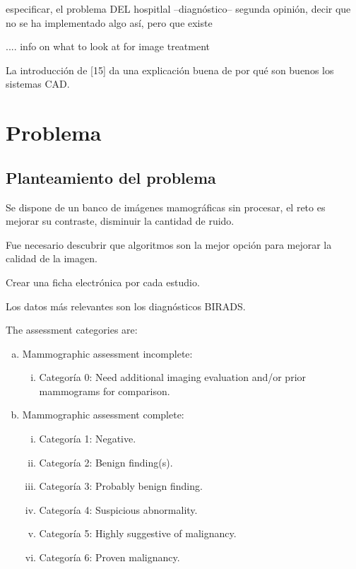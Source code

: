 especificar, el problema DEL
hospitlal --diagnóstico-- segunda opinión, decir que no se ha implementado algo
así, pero que existe
 
.... info on what to look at for image treatment 

La introducción de [15] da una explicación buena de por qué son buenos los
sistemas CAD.

\section{Problema}
\subsection{Planteamiento del problema}

Se dispone de un banco de imágenes mamográficas sin procesar, el reto es mejorar
su contraste, disminuir la cantidad de ruido.

Fue necesario descubrir que algoritmos son la mejor opción para mejorar la
calidad de la imagen.

Crear una ficha electrónica por cada estudio.

Los datos más relevantes son los diagnósticos BIRADS.

The assessment categories are:
\begin{enumerate}[a)]
    \item Mammographic assessment incomplete:
    \begin{enumerate}[i.]
        \item Categoría 0: Need additional imaging evaluation and/or prior
        mammograms for comparison.
    \end{enumerate}
    \item Mammographic assessment complete:
    \begin{enumerate}[i.]
        \item Categoría 1: Negative.
        \item Categoría 2: Benign finding(s).
        \item Categoría 3: Probably benign finding.
        \item Categoría 4: Suspicious abnormality.
        \item Categoría 5: Highly suggestive of malignancy.         
        \item Categoría 6: Proven malignancy.
    \end{enumerate}
\end{enumerate}

